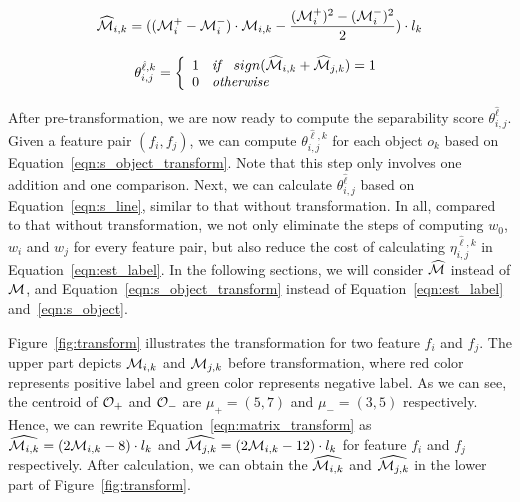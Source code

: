 \begin{equation}\label{eqn:matrix_transform}
\widehat{\mm}_{i,k} = ((\mm_i^+-\mm_i^-)\cdot \mm_{i,k}-\frac{(\mm_i^+)^2-(\mm_i^-)^2}{2})\cdot l_k 
\end{equation}

\begin{equation}\label{eqn:s_object_transform}
\theta_{i,j}^{\hat{\ell},k}=\left\{
                \begin{array}{ll}
                  1 \textit{\hspace{2mm} if \hspace{2mm}} sign(\widehat{\mm}_{i,k} + \widehat{\mm}_{j,k}) = 1\\
                  0 \textit{\hspace{2mm} otherwise \hspace{2mm}} 
                \end{array}
              \right.
\end{equation}


After pre-transformation, we are now ready to compute the separability score $\theta_{i,j}^{\hat{\ell}}$. Given a feature pair $(f_i,f_j)$, we can compute $\theta_{i,j}^{\hat{\ell},k}$ for each object $o_k$ based on Equation~\ref{eqn:s_object_transform}. Note that this step only involves one addition and one comparison. Next, we can calculate $\theta_{i,j}^{\hat{\ell}}$ based on Equation~\ref{eqn:s_line}, similar to that without transformation. In all, compared to that without transformation, we not only eliminate the steps of computing $w_0$, $w_i$ and $w_j$ for every feature pair, but also reduce the cost of calculating $\eta_{i,j}^{\hat{\ell},k}$ in Equation~\ref{eqn:est_label}. In the following sections, we will consider $\widehat{\mm}$ instead of $\mm$, and Equation~\ref{eqn:s_object_transform} instead of Equation~\ref{eqn:est_label} and~\ref{eqn:s_object}.

\begin{example}[Transformation]
Figure~\ref{fig:transform} illustrates the transformation for two feature $f_i$ and $f_j$. The upper part depicts $\mm_{i,k}$ and $\mm_{j,k}$ before transformation, where red color represents positive label and green color represents negative label. As we can see, the centroid of $\oo_+$ and $\oo_-$ are $\mu_+=(5,7)$ and $\mu_-=(3,5)$ respectively. Hence, we can rewrite Equation~\ref{eqn:matrix_transform} as $\widehat{\mm_{i,k}} = (2\mm_{i,k}-8)\cdot l_k$ and $\widehat{\mm_{j,k}} = (2\mm_{i,k}-12)\cdot l_k$ for feature $f_i$ and $f_j$ respectively. After calculation, we can obtain the $\widehat{\mm_{i,k}}$ and $\widehat{\mm_{j,k}}$ in the lower part of Figure~\ref{fig:transform}.
\end{example}


